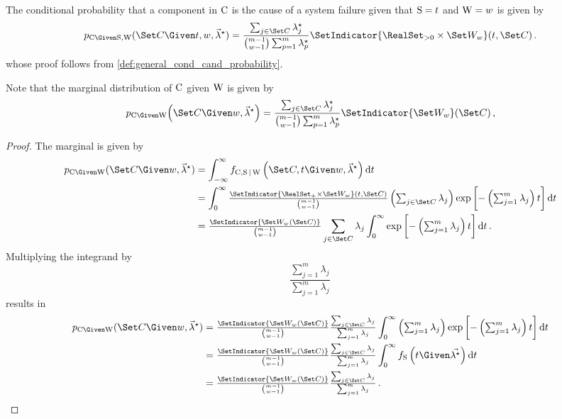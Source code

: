 \documentclass[../main.tex]{subfiles}
\begin{document}
The conditional probability that a component in $\mathrm{C}$ is the cause of a system failure given that $\mathrm{S} = t$ and $\mathrm{W} = w$ is given by
\begin{equation}
\label{eq:expo_cand_given_s}
    \pmf_{\rvcand \Given \sv, \RV{W}}(\cand \Given t, w, \tparam{\vec\lambda}) =
        \frac{ \sum_{j \in \cand} \tparam{\lambda}_j }
            { \binom{m-1}{w-1} \sum_{p=1}^{m} \tparam{\lambda}_p } \SetIndicator{\RealSet_{>0} \times \candsw{w}}(t,\cand)\,.
\end{equation}
whose proof follows from \cref{def:general_cond_cand_probability}.

Note that the marginal distribution of $\mathrm{C}$ given $\mathrm{W}$ is given by
\begin{equation}
\label{eq:expo_cand_given_s}
     \pmf_{\rvcand \Given \RV{W}}\!\left(\cand \Given w, \tparam{\vec\lambda}\right) =
        \frac{ \sum_{j \in \cand} \tparam{\lambda}_j }
            { \binom{m-1}{w-1} \sum_{p=1}^{m} \tparam{\lambda}_p } \SetIndicator{\candsw{w}}(\cand)\,,
\end{equation}
\begin{proof}
The marginal is given by
\begin{align}
     \pmf_{\rvcand \Given \RV{W}}(\cand \Given w, \tparam{\vec\lambda})
        &= \int_{-\infty}^{\infty} \jointpdf\left(\cand, t \Given w, \tparam{\vec\lambda}\right) \dif t\\
        &= \int_{0}^{\infty} \mathsmaller{\frac{\SetIndicator{\RealSet_{+} \times \candsw{w}}(t,\cand)}{\binom{m-1}{w-1}}
        	\left ( \sum_{j \in \cand} \lambda_j \right ) \exp \left [ - \left ( \sum_{j=1}^{m} \lambda_j \right ) t \right ] \dif t}\\
        &= \mathsmaller{\frac{ \SetIndicator{\candsw{w}(\cand)}}{\binom{m-1}{w-1}}} \sum_{j \in \cand} \lambda_j \int_{0}^{\infty} \mathsmaller{ \exp \left [ - \left ( \sum_{j=1}^{m} \lambda_j \right ) t \right ] \dif t}\,.
\end{align}
Multiplying the integrand by
\begin{equation}
    \frac{\sum_{j=1}^{m} \lambda_j}{\sum_{j=1}^{m} \lambda_j}\,
\end{equation}
results in
\begin{align}
     \pmf_{\rvcand \Given \RV{W}}(\cand \Given w, \tparam{\vec\lambda})
        &= \mathsmaller{\frac{ \SetIndicator{\candsw{w}(\cand)} }{\binom{m-1}{w-1}} \frac{\sum_{j \in \cand} \lambda_j}{\sum_{j=1}^{m} \lambda_j}} \int_{0}^{\infty} \mathsmaller{ \left ( \sum_{j=1}^{m} \lambda_j \right) \exp \left [ - \left ( \sum_{j=1}^{m} \lambda_j \right ) t \right ] \dif t}\\
        &= \mathsmaller{\frac{ \SetIndicator{\candsw{w}(\cand)} }{\binom{m-1}{w-1}} \frac{\sum_{j \in \cand} \lambda_j}{\sum_{j=1}^{m} \lambda_j}} \int_{0}^{\infty} \spdf\left(t \Given \vec{\tparam\lambda}\right) \dif t\\
        &= \mathsmaller{\frac{ \SetIndicator{\candsw{w}(\cand)}}{\binom{m-1}{w-1}} \frac{\sum_{j \in \cand} \lambda_j}{\sum_{j=1}^{m} \lambda_j}}\,.
\end{align}
\end{proof}
\end{document}
